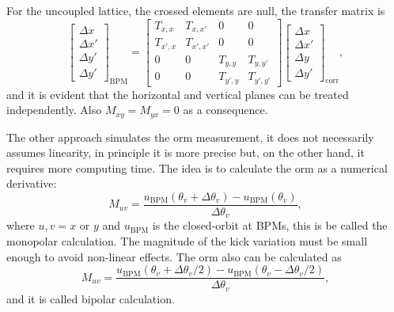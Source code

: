 For the uncoupled lattice, the crossed elements are null, the transfer matrix is
\begin{equation}
    \begin{bmatrix}
    \Delta x \\
    \Delta x' \\
    \Delta y' \\
    \Delta y'
    \end{bmatrix}_{\mathrm{BPM}}  =
    \begin{bmatrix}
    T_{x, x} & T_{x, x'} & 0 & 0  \\
    T_{x', x} & T_{x', x'} & 0 & 0 \\
    0 & 0  & T_{y, y} & T_{y, y'} \\
    0 & 0 & T_{y', y} & T_{y', y'} 
    \end{bmatrix} 
    \begin{bmatrix}
    \Delta x \\
    \Delta x' \\
    \Delta y \\
    \Delta y'
    \end{bmatrix}_{\mathrm{corr}},
\end{equation}
and it is evident that the horizontal and vertical planes can be treated independently. Also $M_{xy} = M_{yx} = 0$ as a consequence.

The other approach simulates the \gls{orm} measurement, it does not necessarily assumes linearity, in principle it is more precise but, on the other hand, it requires more computing time. The idea is to calculate the \gls{orm} as a numerical derivative:
\begin{equation}
    M_{uv} = \dfrac{u_{\mathrm{BPM}}\left(\theta_v + \Delta \theta_v\right)-u_{\mathrm{BPM}}\left(\theta_v \right)}{\Delta \theta_v},
    \label{eq:unipolar_respm}
\end{equation}
where $u, v = x$ or $y$ and $u_{\mathrm{BPM}}$ is the closed-orbit at BPMs, this is be called the monopolar calculation. The magnitude of the kick variation must be small enough to avoid non-linear effects. The \gls{orm} also can be calculated as
\begin{equation}
    M_{uv} = \dfrac{u_{\mathrm{BPM}}\left(\theta_v + \Delta \theta_v/2\right)-u_{\mathrm{BPM}}\left(\theta_v- \Delta \theta_v/2\right)}{\Delta \theta_v},
    \label{eq:bipolar_respm}
\end{equation}
and it is called bipolar calculation.

